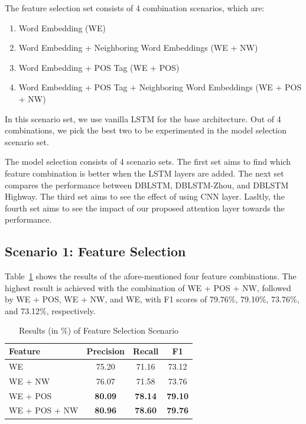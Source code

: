 The feature selection set consists of 4 combination scenarios, which are:
\begin{enumerate}
	\item Word Embedding (WE)
	\item Word Embedding + Neighboring Word Embeddings (WE + NW)
	\item Word Embedding + POS Tag (WE + POS)
	\item Word Embedding + POS Tag + Neighboring Word Embeddings (WE + POS + NW)
\end{enumerate}

In this scenario set, we use vanilla LSTM for the base architecture. Out of 4 combinations, we pick the best two to be experimented in the model selection scenario set.

The model selection consists of 4 scenario sets. The first set aims to find which feature combination is better when the LSTM layers are added. The next set compares the performance between DBLSTM, DBLSTM-Zhou, and DBLSTM Highway. The third set aims to see the effect of using CNN layer. Lasltly, the fourth set aims to see the impact of our proposed attention layer towards the performance.

\subsection{Scenario 1: Feature Selection}
Table~\ref{tab:feature_scenario} shows the results of the afore-mentioned four feature combinations. The highest result is achieved with the combination of WE + POS + NW, followed by WE + POS, WE + NW, and WE, with F1 scores of 79.76\%, 79.10\%, 73.76\%, and 73.12\%, respectively. 

\begin{table}
	\centering
	\caption{Results (in \%) of Feature Selection Scenario}
	\label{tab:feature_scenario}
	\begin{tabular}{lccc}
		\hline
		Feature & Precision & Recall & F1 \\
		\hline\hline
		WE & 75.20 & 71.16 & 73.12 \\
		WE + NW & 76.07 & 71.58 & 73.76 \\
		WE + POS & \textbf{80.09} & \textbf{78.14} & \textbf{79.10} \\
		WE + POS + NW & \textbf{80.96} & \textbf{78.60} & \textbf{79.76} \\
		\hline
	\end{tabular}

\end{table}

